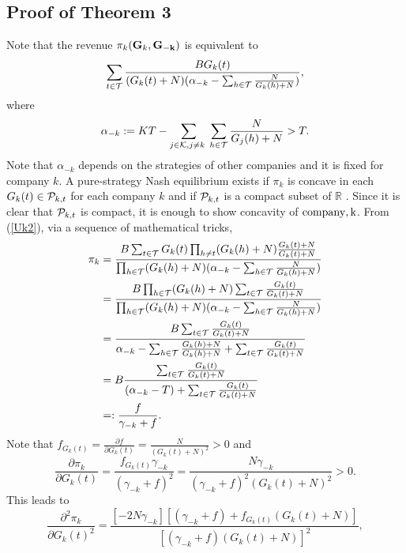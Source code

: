 \subsection{Proof of Theorem 3} \label{game2proof}
Note that the revenue $\pi_k({\bf{G}}_k,{\bf{G_{-k}}})$ is equivalent  to
\begin{equation} \sum_{t\in {\cal T}}\frac{BG_k(t)}{(G_k(t)+N)(\alpha_{-k}-\sum_{h\in {\cal T}}\frac{N}{G_k(h)+N})} ,\label{Uk2} \end{equation}
where   $$\alpha_{-k}:=  KT-\sum_{j\in {\cal K},j\neq k\,\,} \sum_{h\in {\cal T}}\frac{N}{G_j(h)+N}> T.$$ 
Note that $\alpha_{-k}$ depends on the strategies of other companies and it is fixed for company $k$. 
A pure-strategy Nash equilibrium exists if $\pi_k$ is concave in each $G_k(t)\in{\cal P}_{k,t}$ for each company $k$ and if  ${\cal P}_{k,t}$ is a compact subset of $\mathbb{R}$ \cite{basar}. 
Since it is clear that ${\cal P}_{k,t}$ is compact, it is enough to show concavity of ${ \rm company,k}$. From (\ref{Uk2}), via a sequence of mathematical tricks, 
\begin{align}\pi_k&=\frac{B\sum_{t\in {\cal T}}G_k(t)\prod_{h\neq t}(G_k(h)+N)\frac{G_k(t)+N}{G_k(t)+N}}{\prod_{h\in{\cal T}}(G_k(h)+N)(\alpha_{-k}-\sum_{h\in {\cal T}}\frac{N}{G_k(h)+N})} \nonumber \\
&=\frac{B\prod_{h\in{\cal T}}(G_k(h)+N)\sum_{t\in {\cal T}}\frac{G_k(t)}{G_k(t)+N}}{\prod_{h\in{\cal T}}(G_k(h)+N)(\alpha_{-k}-\sum_{h\in {\cal T}}\frac{N}{G_k(h)+N})} \nonumber \\
&=\frac{B\sum_{t\in {\cal T}}\frac{G_k(t)}{G_k(t)+N}}{\alpha_{-k}-\sum_{h\in {\cal T}}\frac{G_k(h)+N}{G_k(h)+N}+\sum_{t\in {\cal T}}\frac{G_k(t)}{G_k(t)+N}} \nonumber\\
&=B\frac{\sum_{t\in {\cal T}}\frac{G_k(t)}{G_k(t)+N}}{(\alpha_{-k}-T)+\sum_{t\in {\cal T}}\frac{G_k(t)}{G_k(t)+N}} \nonumber \\ 
&=:\frac{f}{\gamma_{-k}+f}.\end{align}
Note that $f_{G_k(t)}=\frac{\partial f}{\partial G_k(t)}=\frac{N}{(G_k(t)+N)^2} > 0$ and
\begin{equation*}\frac{\partial \pi_k}{\partial G_k(t)}=\frac{f_{G_k(t)}\gamma_{-k}}{(\gamma_{-k}+f)^2}=\frac{N\gamma_{-k}}{(\gamma_{-k}+f)^2(G_k(t)+N)^2} >0. \label{der1} \end{equation*}
This leads to
\begin{equation*}\frac{\partial^2 \pi_k}{\partial G_k(t)^2}=\frac{[-2N\gamma_{-k}][(\gamma_{-k}+f)+f_{G_k(t)}(G_k(t)+N)]}{[(\gamma_{-k}+f)(G_k(t)+N)]^2}, \label{der2} \end{equation*}
